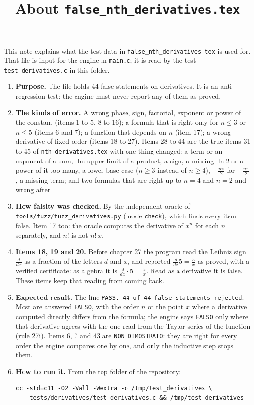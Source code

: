 \documentclass[11pt,a4paper]{article}
\title{About \texttt{false\_nth\_derivatives.tex}}
\author{}
\date{}
\begin{document}
\maketitle
This note explains what the test data in \texttt{false\_nth\_derivatives.tex} is used for. That file is input for the engine in \texttt{main.c}; it is read by the test \texttt{test\_derivatives.c} in this folder.

\begin{enumerate}
\item \textbf{Purpose.} The file holds 44 false statements on derivatives. It is an anti-regression test: the engine must never report any of them as proved.

\item \textbf{The kinds of error.} A wrong phase, sign, factorial, exponent or power of the constant (items 1 to 5, 8 to 16); a formula that is right only for $n \le 3$ or $n \le 5$ (items 6 and 7); a function that depends on $n$ (item 17); a wrong derivative of fixed order (items 18 to 27). Items 28 to 44 are the true items 31 to 45 of \texttt{nth\_derivatives.tex} with one thing changed: a term or an exponent of a sum, the upper limit of a product, a sign, a missing $\ln 2$ or a power of it too many, a lower base case ($n \ge 3$ instead of $n \ge 4$), $-\frac{n\pi}{2}$ for $+\frac{n\pi}{2}$, a missing term; and two formulas that are right up to $n = 4$ and $n = 2$ and wrong after.

\item \textbf{How falsity was checked.} By the independent oracle of \texttt{tools/fuzz/fuzz\_derivatives.py} (mode \texttt{check}), which finds every item false. Item 17 too: the oracle computes the derivative of $x^n$ for each $n$ separately, and $n!$ is not $n!\,x$.

\item \textbf{Items 18, 19 and 20.} Before chapter 27 the program read the Leibniz sign $\frac{d}{dx}$ as a fraction of the letters $d$ and $x$, and reported $\frac{d}{dx} 5 = \frac{5}{x}$ as proved, with a verified certificate: as algebra it is $\frac{d}{dx} \cdot 5 = \frac{5}{x}$. Read as a derivative it is false. These items keep that reading from coming back.

\item \textbf{Expected result.} The line \texttt{PASS: 44 of 44 false statements rejected}. Most are answered \texttt{FALSO}, with the order $n$ or the point $x$ where a derivative computed directly differs from the formula; the engine says \texttt{FALSO} only where that derivative agrees with the one read from the Taylor series of the function (rule 27i). Items 6, 7 and 43 are \texttt{NON DIMOSTRATO}: they are right for every order the engine compares one by one, and only the inductive step stops them.

\item \textbf{How to run it.} From the top folder of the repository:
\begin{verbatim}
cc -std=c11 -O2 -Wall -Wextra -o /tmp/test_derivatives \
    tests/derivatives/test_derivatives.c && /tmp/test_derivatives
\end{verbatim}
\end{enumerate}
\end{document}
